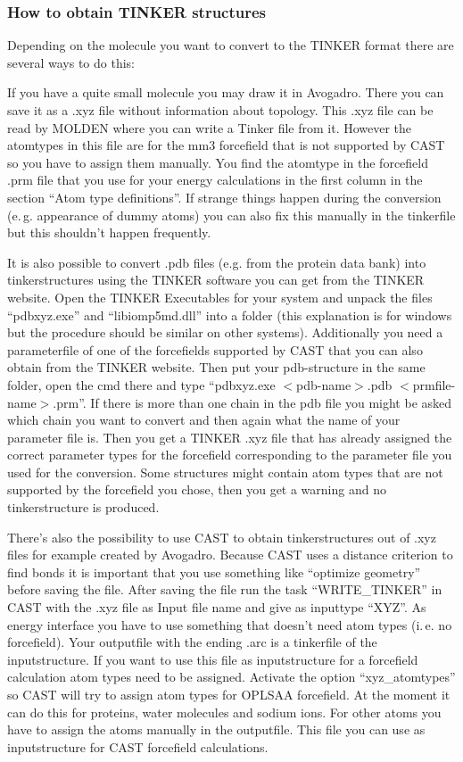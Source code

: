 \documentclass[10pt,a4paper]{article} %
\begin{document}
	
	\subsubsection{How to obtain TINKER structures} \label{sec:tinker}
	
	Depending on the molecule you want to convert to the TINKER format there are several ways to do this:
	
	If you have a quite small molecule you may draw it in Avogadro. There you can save it as a .xyz file without information about topology. This .xyz file can be read by MOLDEN where you can write a Tinker file from it. However the atomtypes in this file are for the mm3 forcefield that is not supported by \ac{CAST} so you have to assign them manually. You find the atomtype in the forcefield .prm file that you use for your energy calculations in the first column in the section ``Atom type definitions''. If strange things happen during the conversion (e.\,g. appearance of dummy atoms) you can also fix this manually in the tinkerfile but this shouldn't happen frequently.
	
	It is also possible to convert .pdb files (e.g. from the protein data bank\supercite{noauthor_rcsb_nodate}) into tinkerstructures using the TINKER software you can get from the TINKER website\supercite{noauthor_tinker_nodate}. Open the TINKER Executables for your system and unpack the files ``pdbxyz.exe'' and ``libiomp5md.dll'' into a folder (this explanation is for windows but the procedure should be similar on other systems). Additionally you need a parameterfile of one of the forcefields supported by \ac{CAST} that you can also obtain from the TINKER website. Then put your pdb-structure in the same folder, open the cmd there and type ``pdbxyz.exe $<$pdb-name$>$.pdb $<$prmfile-name$>$.prm''. If there is more than one chain in the pdb file you might be asked which chain you want to convert and then again what the name of your parameter file is. Then you get a TINKER .xyz file that has already assigned the correct parameter types for the forcefield corresponding to the parameter file you used for the conversion. Some structures might contain atom types that are not supported by the forcefield you chose, then you get a warning and no tinkerstructure is produced.
	
	There's also the possibility to use CAST to obtain tinkerstructures out of .xyz files for example created by Avogadro. Because CAST uses a distance criterion to find bonds it is important that you use something like ``optimize geometry'' before saving the file. After saving the file run the task ``WRITE\_TINKER'' in CAST with the .xyz file as Input file name and give as inputtype ``XYZ''. As energy interface you have to use something that doesn't need atom types (i.\,e. no forcefield). Your outputfile with the ending .arc is a tinkerfile of the inputstructure. If you want to use this file as inputstructure for a forcefield calculation atom types need to be assigned. Activate the option ``xyz\_atomtypes'' so CAST will try to assign atom types for OPLSAA forcefield. At the moment it can do this for proteins, water molecules and sodium ions. For other atoms you have to assign the atoms manually in the outputfile. This file you can use as inputstructure for CAST forcefield calculations.
	
\end{document}
